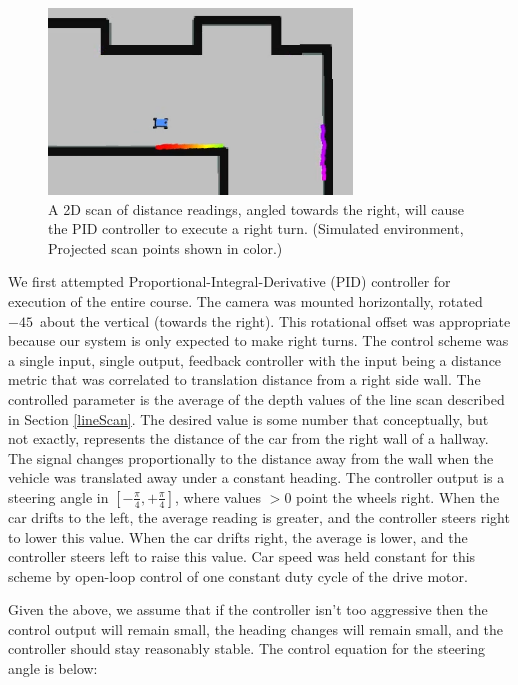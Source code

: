 \documentclass[letterpaper, 10 pt, conference]{ieeeconf}  %
\begin{document}
\begin{figure}[t]
    \centering
    \includegraphics{Figures/emergentTurn.png}
    \caption{A 2D scan of distance readings, angled towards the right, will cause the PID controller to execute a right turn. (Simulated environment, Projected scan points shown in color.)}
    \label{emergentTurn}
\end{figure}

We first attempted Proportional-Integral-Derivative (PID) controller for execution of the entire course.  The camera was mounted horizontally, rotated $-45$\textdegree \ about the vertical (towards the right).  This rotational offset was appropriate because our system is only expected to make right turns.  The control scheme was a single input, single output, feedback controller with the input being a distance metric that was correlated to translation distance from a right side wall.  The controlled parameter is the average of the depth values of the line scan described in Section \ref{lineScan}.  The desired value is some number that conceptually, but not exactly, represents the distance of the car from the right wall of a hallway.  The signal changes proportionally to the distance away from the wall when the vehicle was translated away under a constant heading.   The controller output is a steering angle in $\left[  -\frac{\pi}{4} , +\frac{\pi}{4} \right]$, where values $>0$ point the wheels right.  When the car drifts to the left, the average reading is greater, and the controller steers right to lower this value.  When the car drifts right, the average is lower, and the controller steers left to raise this value.  Car speed was held constant for this scheme by open-loop control of one constant duty cycle of the drive motor.

Given the above,  we assume that if the controller isn't too aggressive then the control output will remain small, the heading changes will remain small, and the controller should stay reasonably stable. The control equation for the steering angle is below:  
\end{document}
